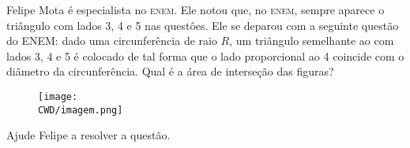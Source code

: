 %

Felipe Mota é especialista no \textsc{enem}. Ele notou que, no \textsc{enem}, sempre aparece o triângulo com lados 3, 4 e 5 nas questôes. Ele se deparou com a seguinte questão do ENEM: dado uma circunferência de raio $R$, um triângulo semelhante ao com lados 3, 4 e 5 é colocado de tal forma que o lado proporcional ao 4 coincide com o diâmetro da circunferência. Qual é a área de interseção das figuras?

\begin{figure}[H]
  \centering
  \texttt{[image: \\CWD/imagem.png]}
\end{figure}

Ajude Felipe a resolver a questão.

%
%

%
%



\sampleio
